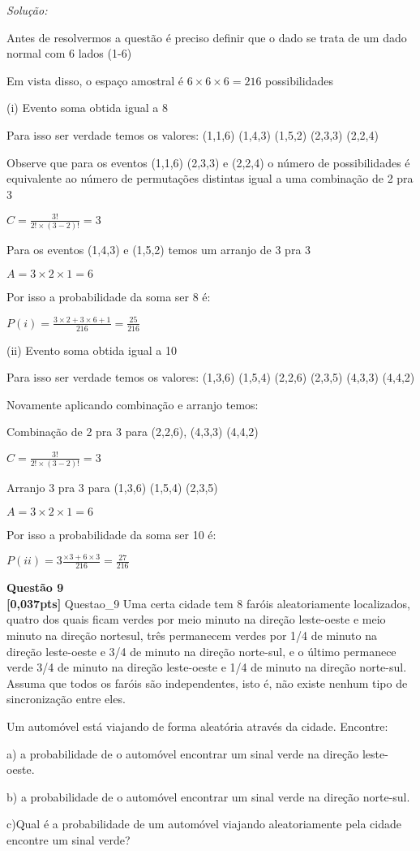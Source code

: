 \documentclass{article}
\newenvironment{problem}[2][Questão]
    { \begin{mdframed}[backgroundcolor=gray!20] \textbf{#1 #2} \\}
    {  \end{mdframed}}
\newenvironment{solution}
    {\textit{Solução:}}
    {}
\begin{document}
\begin{solution}

Antes de resolvermos a questão é preciso definir que o dado se trata de um dado normal com 6 lados (1-6)

Em vista disso, o espaço amostral é $6 \times 6 \times 6 = 216$ possibilidades 

(i) Evento soma obtida igual a 8

Para isso ser verdade temos os valores: (1,1,6) (1,4,3) (1,5,2) (2,3,3) (2,2,4)

Observe que para os eventos (1,1,6) (2,3,3) e (2,2,4) o número de possibilidades é equivalente ao número de permutações distintas igual a uma combinação de 2 pra 3

$C= \frac{3!}{2! \times (3 - 2)!} = 3$

Para os eventos (1,4,3) e (1,5,2) temos um arranjo de 3 pra 3

$A=3 \times 2 \times 1 = 6$

Por isso a probabilidade da soma ser 8 é:

$P(i) = \frac{3 \times 2 + 3 \times 6 + 1}{216} = \frac{25}{216}$

(ii) Evento soma obtida igual a 10

Para isso ser verdade temos os valores: (1,3,6) (1,5,4) (2,2,6) (2,3,5) (4,3,3) (4,4,2)

Novamente aplicando combinação e arranjo temos:

Combinação de 2 pra 3 para (2,2,6), (4,3,3) (4,4,2)

$C= \frac{3!}{2! \times (3 - 2)!} = 3$

Arranjo 3 pra 3 para (1,3,6) (1,5,4) (2,3,5)

$A=3 \times 2 \times 1 = 6$

Por isso a probabilidade da soma ser 10 é:

$P(ii) = 3 \frac{\times 3 + 6 \times 3}{216} = \frac{27}{216}$

\end{solution}

\begin{problem}{9}
\textbf{[0,037pts]} Questao\_9 Uma certa cidade tem 8 faróis aleatoriamente localizados, quatro dos quais ficam verdes por 
meio minuto na direção leste-oeste e meio minuto na direção nortesul, três permanecem verdes 
por  1/4  de  minuto  na  direção  leste-oeste  e  3/4  de  minuto  na  direção  norte-sul,  e  o  último 
permanece verde 3/4 de minuto na direção leste-oeste e 1/4 de minuto na direção norte-sul. 
Assuma que todos os faróis são independentes, isto é, não existe nenhum tipo de sincronização 
entre eles.

Um automóvel está viajando de forma aleatória através da cidade. Encontre: 

a) a probabilidade de o automóvel encontrar um sinal verde na direção leste-oeste. 

b) a probabilidade de o automóvel encontrar um sinal verde na direção norte-sul. 

c)Qual  é  a  probabilidade  de  um  automóvel viajando  aleatoriamente  pela  cidade encontre  um 
sinal verde?

\end{problem}
\end{document}
